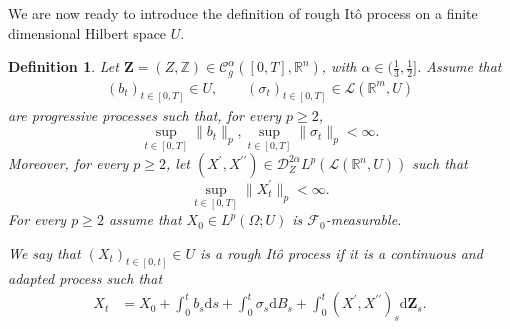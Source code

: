 \documentclass[11pt,a4paper]{article}
\newcommand{\R}{\mathbb{R}}
\newcommand{\rd}{\mathrm{d}}
\newtheorem{defn}{Definition}[section]
\theoremstyle{plain}
\begin{document}
We are now ready to introduce the definition of rough It\^o process on a finite dimensional Hilbert space $U$.
\begin{defn}
    \label{def: rough ito process}
    Let $\mathbf{Z} = (Z, \mathbb{Z})\in \mathscr{C}^{\alpha}_g([0,T],\R^n)$, with $\alpha \in (\frac{1}{3},\frac{1}{2}]$.
    Assume that
     \begin{align*}
         (b_t)_{t\in [0,T]}\in U,
         \qquad
         (\sigma_t)_{t\in [0,T]}\in\mathscr{L}(\R^m,U) 
     \end{align*}
     are progressive processes such that, for every $p\geq 2$,
     \begin{equation}
         \label{eq: boundedness in Lp coefficients}
         \sup_{t\in [0,T]}\|b_t\|_{p},
         \sup_{t\in [0,T]}\|\sigma_t\|_{p} < \infty.
     \end{equation}
     Moreover, for every $p\geq 2$, let $(X^{\prime},X^{\prime\prime}) \in \mathscr{D}_Z^{2\alpha} L^p(\mathscr{L}(\R^{n},U))$ such that
     \begin{equation}
     \label{eq: boundedness in Lp derivative}
          \sup_{t\in [0,T]}\|X^{\prime}_t\|_{p}
         < \infty.
     \end{equation}
     For every $p\geq 2$ assume that $X_0\in L^p(\Omega;U)$ is $\mathcal{F}_0$-measurable.
     
     We say that $(X_t)_{t\in[0,t]} \in U$ is a \textit{rough It\^o process} if it is a continuous and adapted process such that
     \begin{align*}
         X_t &= X_0 + \int_0^t b_s \rd s + \int_0^t\sigma_s \rd B_s + \int_0^t (X^{\prime}, X^{\prime\prime})_s \rd \mathbf{Z}_s.
     \end{align*}
\end{defn}
\end{document}
